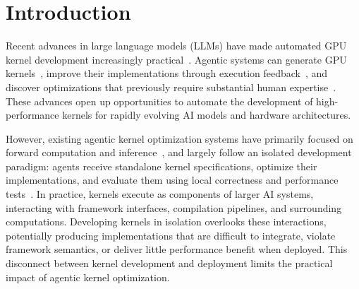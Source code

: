 \section{Introduction}


Recent advances in large language models (LLMs) have made automated GPU kernel development increasingly practical~\cite{claude, codex}. Agentic systems can generate GPU kernels~\cite{wang2025geak, zhang2025cudaforge}, improve their implementations through execution feedback~\cite{kernelblater, gai2026kernelpro}, and discover optimizations that previously require substantial human expertise~\cite{liao2026kernelevolve,ye2026cake}.
These advances open up opportunities to automate the development of high-performance kernels for rapidly evolving AI models and hardware architectures. 

However, existing agentic kernel optimization systems have primarily focused on forward computation and inference~\cite{ouyang2025kernelbench,flashinferbench,oliaro2026fastkernels}, and largely follow an isolated development paradigm: agents receive standalone kernel specifications, optimize their implementations, and evaluate them using local correctness and performance tests~\cite{execbench}. In practice, kernels execute as components of larger AI systems, interacting with framework interfaces, compilation pipelines, and surrounding computations. Developing kernels in isolation overlooks these interactions, potentially producing implementations that are difficult to integrate, violate framework semantics, or deliver little performance benefit when deployed. This disconnect between kernel development and deployment limits the practical impact of agentic kernel optimization.

